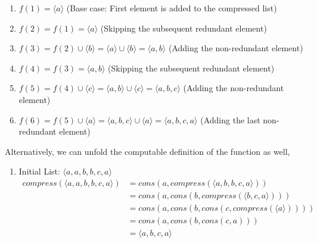 \documentclass[12pt]{article}
\begin{document}
\begin{spacing}{1.5}
\begin{enumerate}
\begin{enumerate}
		      	\item $f(1) = \langle a \rangle$ (Base case: First element is added to the compressed list)
		      	      		      	      
		      	\item $f(2) = f(1) = \langle a \rangle$ (Skipping the subsequent redundant element)
		      	      		      	      
		      	\item $f(3) = f(2) \cup \langle b \rangle = \langle a \rangle \cup \langle b \rangle = \langle a, b \rangle$ (Adding the non-redundant element)
		      	      		      	      
		      	\item $f(4) = f(3) = \langle a, b \rangle$ (Skipping the subsequent redundant element)
		      	      		      	      
		      	\item $f(5) = f(4) \cup \langle c \rangle = \langle a, b \rangle \cup \langle c \rangle = \langle a, b, c \rangle$ (Adding the non-redundant element)
		      	      		      	      
		      	\item $f(6) = f(5) \cup \langle a \rangle = \langle a, b, c \rangle \cup \langle a \rangle = \langle a, b, c, a \rangle$ (Adding the last non-redundant element)\\
		      \end{enumerate}
		      
		      Alternatively, we can unfold the computable definition of the function as well,
		      
		      \begin{enumerate}
		      	\item Initial List: $\langle a, a, b, b, c, a \rangle$
		      	      \begin{align*}
		      	      	compress(\langle a, a, b, b, c, a \rangle) & = cons(a, compress(\langle a, b, b, c, a \rangle))       \\
                           & = cons(a, cons(b, compress(\langle b, c, a \rangle)))    \\
                           & = cons(a, cons(b, cons(c, compress(\langle a \rangle)))) \\
                           & = cons(a, cons(b, cons(c, a)))                           \\
                           & = \langle a, b, c, a \rangle                             
		      	      \end{align*}
		      	                      

\end{enumerate}
\end{enumerate}
\end{spacing}
\end{document}
